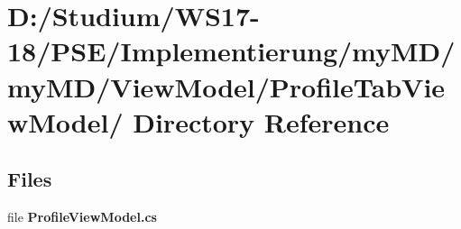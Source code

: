 \hypertarget{dir_D_3A_2FStudium_2FWS17_2D18_2FPSE_2FImplementierung_2FmyMD_2FmyMD_2FViewModel_2FProfileTabViewModel_2F}{
\section{D:/Studium/WS17-18/PSE/Implementierung/my\-MD/my\-MD/View\-Model/Profile\-Tab\-View\-Model/ Directory Reference}
\label{dir_D_3A_2FStudium_2FWS17_2D18_2FPSE_2FImplementierung_2FmyMD_2FmyMD_2FViewModel_2FProfileTabViewModel_2F}
}


\subsection*{Files}
\begin{CompactItemize}
\item 
file {\bf Profile\-View\-Model.cs}
\end{CompactItemize}
